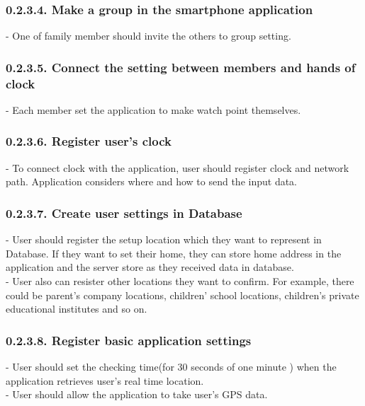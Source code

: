 \documentclass[10pt,a4paper,twocolumn]{report}
\begin{document}
 		\subsubsection{0.2.3.4. Make a group in the smartphone application}
     	- One of family member should invite the others to group setting.\\
     	
     	\subsubsection{0.2.3.5. Connect the setting between members and hands of clock}
     	- Each member set the application to make watch point themselves. \\
     	
		\subsubsection{0.2.3.6. Register user’s clock}
     	- To connect clock with the application, user should register clock and network path. 			
     	Application considers where and how to send the input data.\\
     	
     	\subsubsection{0.2.3.7. Create user settings in Database}
     	- User should register the setup location which they want to represent in Database. If they 
     	want to set their home, they can store home address in the application and the server store as 
     	they received data in database.\\
 		- User also can resister other locations they want to confirm. For example, there could be 	
 		parent’s company locations, children’ school locations, children’s private educational 
 		institutes and so on.\\
 		
		\subsubsection{0.2.3.8. Register basic application settings}
     	- User should set the checking time(for 30 seconds of one minute ) when the application 		          retrieves user’s real time location.\\
     	- User should allow the application to take user’s GPS data.\\
     	
\end{document}
